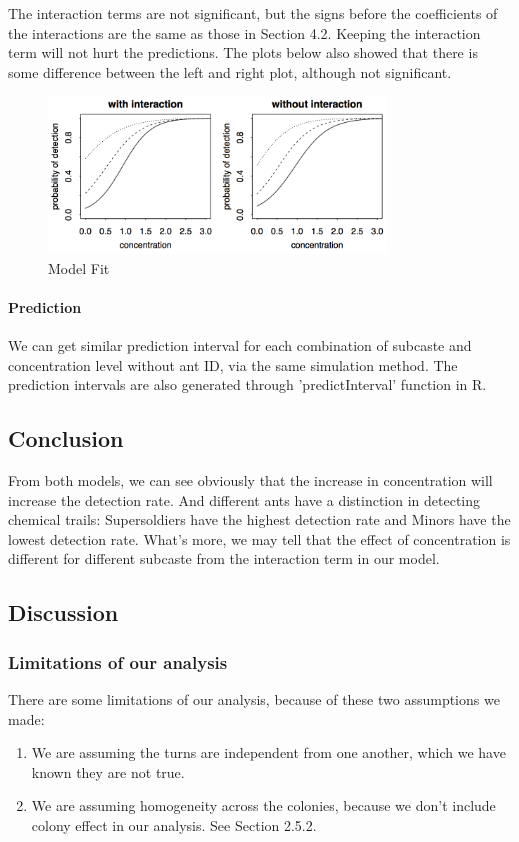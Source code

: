 \documentclass{article}
\begin{document}
	The interaction terms are not significant, but the signs before the coefficients of the interactions are the same as those in Section 4.2. Keeping the interaction term will not hurt the predictions. The plots below also showed that there is some difference between the left and right plot, although not significant.	
	
	\begin{figure}[h]
		\centering
		\includegraphics[width=0.8\textwidth]{AntModel2plot}
		\caption{Model Fit}
	\end{figure}
	
	\paragraph{Prediction}
	We can get similar prediction interval for each combination of subcaste and concentration level without ant ID, via the same simulation method. The prediction intervals are also generated through 'predictInterval' function in R.
	
	\subsection{Conclusion}
	From both models, we can see obviously that the increase in concentration will increase the detection rate. And different ants have a distinction in detecting chemical trails: Supersoldiers have the highest detection rate and Minors have the lowest detection rate. What's more, we may tell that the effect of concentration is different for different subcaste from the interaction term in our model.
	
	\subsection{Discussion}
	\subsubsection{Limitations of our analysis}
	There are some limitations of our analysis, because of these two assumptions we made: 
	\begin{enumerate}
		\item We are assuming the turns are independent from one another, which we have known they are not true.
		\item We are assuming homogeneity across the colonies, because we don’t include colony effect in our analysis. See Section 2.5.2.
	\end{enumerate} 
	
\end{document}
